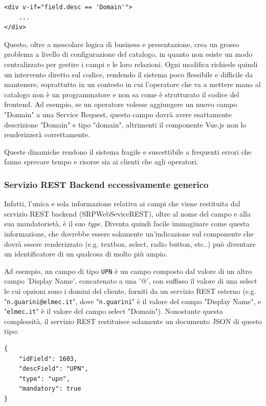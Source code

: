 \begin{verbatim}
<div v-if="field.desc == 'Domain'">
    ...
</div>
\end{verbatim}

Questo, oltre a mescolare logica di business e presentazione, crea un grosso problema a livello di configurazione del catalogo, in quanto non esiste un modo centralizzato per gestire i campi e le loro relazioni. Ogni modifica richiede quindi un intervento diretto sul codice, rendendo il sistema poco flessibile e difficile da mantenere, soprattutto in un contesto in cui l'operatore che va a mettere mano al catalogo non è un programmatore e non sa come è strutturato il codice del frontend. 
Ad esempio, se un operatore volesse aggiungere un nuovo campo "Domain" a una Service Request, questo campo dovrà avere esattamente descrizione "Domain" e tipo "domain", altrimenti il componente Vue.js non lo renderizzerà correttamente. 

Queste dinamiche rendono il sistema fragile e suscettibile a frequenti errori che fanno sprecare tempo e risorse sia ai clienti che agli operatori.

\subsubsection{Servizio REST Backend eccessivamente generico}

Infatti, l'unica e sola informazione relativa ai campi che viene restituita dal servizio REST backend (SRPWebSeviceREST), oltre al nome del campo e alla sua mandatorietà, è il suo \textit{type}. Diventa quindi facile immaginare come questa informazione, che dovrebbe essere solamente un'indicazione sul componente che dovrà essere renderizzato (e.g. textbox, select, radio button, etc..) può diventare un identificatore di un qualcosa di molto più ampio. 

Ad esempio, un campo di tipo \texttt{UPN} è un campo composto dal valore di un altro campo 'Display Name', concatenato a una '@', con suffisso il valore di una select le cui opzioni sono i domini del cliente, forniti da un servizio REST esterno (e.g. "\texttt{n.guarini@elmec.it}", dove "\texttt{n.guarini}" è il valore del campo "Display Name", e "\texttt{elmec.it}" è il valore del campo select "Domain"). Nonostante questa complessità, il servizio REST restituisce solamente un documento JSON di questo tipo:

\begin{verbatim}
{
    "idField": 1603,
    "descField": "UPN",
    "type": "upn",
    "mandatory": true
}
\end{verbatim}

